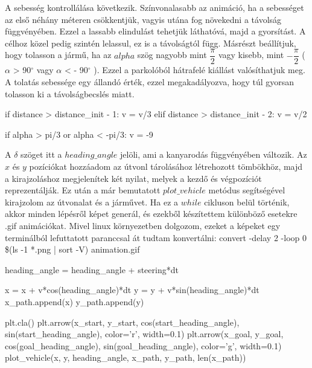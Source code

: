 \bigskip

A sebesség kontrollálása következik. Színvonalasabb az animáció, ha a sebességet az első néhány méteren csökkentjük, vagyis utána fog növekedni a távolság függvényében. Ezzel a lassabb elindulást tehetjük láthatóvá, majd a gyorsítást. A célhoz közel pedig szintén lelassul, ez is a távolságtól függ. Másrészt beállítjuk, hogy tolasson a jármű, ha az $ alpha $ szög nagyobb mint $ \dfrac{\pi}{2} $ vagy kisebb, mint $ -\dfrac{\pi}{2} $ ( $ \alpha $ > 90$^{\circ}$ vagy $ \alpha $ < - 90$^{\circ}$ ). Ezzel a parkolóból hátrafelé kiállást valósíthatjuk meg. A tolatás sebessége egy állandó érték, ezzel megakadályozva, hogy túl gyorsan tolasson ki a távolságbecslés miatt.

\begin{python}
        if distance > distance_init - 1:
            v = v/3
        elif distance > distance_init - 2:
            v = v/2

        if alpha > pi/3 or alpha < -pi/3:
            v = -9
\end{python}

\bigskip

A $ \delta $ szöget itt a $ heading\_angle $ jelöli, ami a kanyarodás függvényében változik. Az $ x $ és $ y $ pozíciókat  hozzáadom az útvonl tárolásához létrehozott tömbökhöz, majd a kirajzoláshoz megjelenítek két nyilat, melyek a kezdő és végpozíciót reprezentálják. Ez után a már bemutatott $ plot\_vehicle $ metódus segítségével kirajzolom az útvonalat és a járművet. Ha ez a $ while $ cikluson belül történik, akkor minden lépésről képet generál, és ezekből készítettem különböző esetekre .gif animációkat. Mivel linux környezetben dolgozom, ezeket a képeket egy terminálból lefuttatott paranccsal át tudtam konvertálni: convert -delay 2 -loop 0 \$(ls -1 *.png | sort -V) animation.gif

\begin{python}
 	heading_angle = heading_angle + steering*dt

        x = x + v*cos(heading_angle)*dt
        y = y + v*sin(heading_angle)*dt
        x_path.append(x)
        y_path.append(y)

        plt.cla()
        plt.arrow(x_start, y_start, cos(start_heading_angle),
                  sin(start_heading_angle), color='r', width=0.1)
        plt.arrow(x_goal, y_goal, cos(goal_heading_angle),
                  sin(goal_heading_angle), color='g', width=0.1)
        plot_vehicle(x, y, heading_angle, x_path, y_path, len(x_path))
\end{python}

